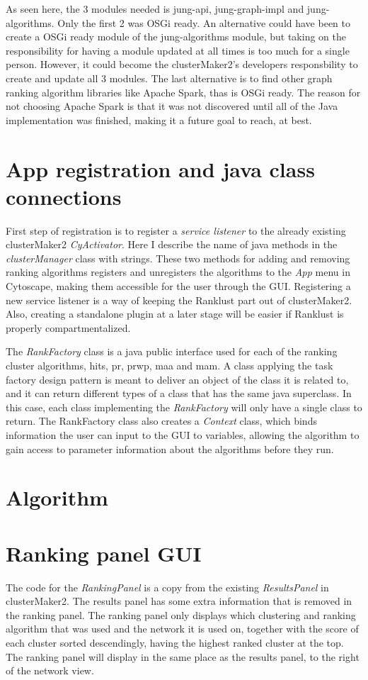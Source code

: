 As seen here, the 3 modules needed is jung-api, jung-graph-impl and
jung-algorithms. Only the first 2 was OSGi ready. An alternative could have been
to create a OSGi ready module of the jung-algorithms module, but taking on the
responsibility for having a module updated at all times is too much for a single
person. However, it could become the clusterMaker2's developers responsbility to
create and update all 3 modules. The last alternative is to find other graph
ranking algorithm libraries like Apache Spark\cite{spark}, thas is OSGi ready.
The reason for not choosing Apache Spark is that it was not discovered until all
of the Java implementation was finished, making it a future goal to reach, at
best.

\section{App registration and java class connections}
First step of registration is to register a \textit{service listener} to the
already existing clusterMaker2 \textit{CyActivator}. Here I describe the name
of java methods in the \textit{clusterManager} class with strings. These two
methods for adding and removing ranking algorithms registers and unregisters the
algorithms to the \textit{App} menu in Cytoscape, making them accessible for the
user through the GUI. Registering a new service listener is a way of keeping the
Ranklust part out of clusterMaker2. Also, creating a standalone plugin at
a later stage will be easier if Ranklust is properly compartmentalized.

The \textit{RankFactory} class is a java public interface used for each of the
ranking cluster algorithms, \gls{hits}, \gls{pr}, \gls{prwp}, \gls{maa} and
\gls{mam}. A class applying the task factory design pattern is meant to deliver
an object of the class it is related to\cite{factory-design}, and it can return
different types of a class that has the same java
superclass\cite{java-superclass}. In this case, each class implementing the
\textit{RankFactory} will only have a single class to return. The RankFactory
class also creates a \textit{Context} class, which binds information the user
can input to the GUI to variables, allowing the algorithm to gain access to
parameter information about the algorithms before they run.

\section{Algorithm}
\section{Ranking panel GUI}
The code for the \textit{RankingPanel} is a copy from the existing
\textit{ResultsPanel} in clusterMaker2. The results panel has some extra
information that is removed in the ranking panel. The ranking panel only
displays which clustering and ranking algorithm that was used and the network it
is used on, together with the score of each cluster sorted descendingly, having
the highest ranked cluster at the top. The ranking panel will display in the
same place as the results panel, to the right of the network view.

